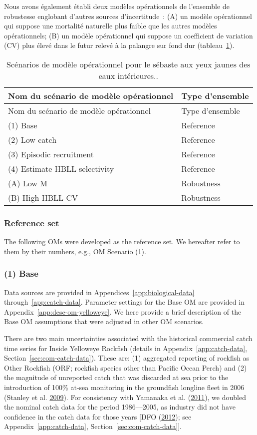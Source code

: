 \documentclass[11pt]{book}
\begin{document}
Nous avons également établi deux modèles opérationnels de l'ensemble de robustesse englobant d'autres sources d'incertitude~: (A) un modèle opérationnel qui suppose une mortalité naturelle plus faible que les autres modèles opérationnels; (B) un modèle opérationnel qui suppose un coefficient de variation (CV) plus élevé dans le futur relevé à la palangre sur fond dur (tableau~\ref{tab:ye-scen}).
\begin{longtable}[]{@{}ll@{}}
\caption{\label{tab:ye-scen}Scénarios de modèle opérationnel pour le sébaste aux yeux jaunes des eaux intérieures..}\tabularnewline
\toprule
Nom du scénario de modèle opérationnel & Type d'ensemble\tabularnewline
\midrule
\endfirsthead
\toprule
Nom du scénario de modèle opérationnel & Type d'ensemble\tabularnewline
\midrule
\endhead
(1) Base & Reference\tabularnewline
(2) Low catch & Reference\tabularnewline
(3) Episodic recruitment & Reference\tabularnewline
(4) Estimate HBLL selectivity & Reference\tabularnewline
(A) Low M & Robustness\tabularnewline
(B) High HBLL CV & Robustness\tabularnewline
\bottomrule
\end{longtable}
\hypertarget{sec:approach3-reference}{%
\subsubsection{Reference set}\label{sec:approach3-reference}}

The following OMs were developed as the reference set. We hereafter refer to them by their numbers, e.g., OM Scenario (1).

\hypertarget{sec:approach3-reference1}{%
\subsubsection{(1) Base}\label{sec:approach3-reference1}}

Data sources are provided in Appendices~\ref{app:biological-data} through~\ref{app:catch-data}. Parameter settings for the Base OM are provided in Appendix~\ref{app:desc-om-yelloweye}. We here provide a brief description of the Base OM assumptions that were adjusted in other OM scenarios.

There are two main uncertainties associated with the historical commercial catch time series for Inside Yelloweye Rockfish (details in Appendix~\ref{app:catch-data}, Section~\ref{sec:com-catch-data}). These are: (1) aggregated reporting of rockfish as Other Rockfish (ORF; rockfish species other than Pacific Ocean Perch) and (2) the magnitude of unreported catch that was discarded at sea prior to the introduction of 100\% at-sea monitoring in the groundfish longline fleet in 2006 (Stanley et al. \protect\hyperlink{ref-stanley2009}{2009}). For consistency with Yamanaka et al. (\protect\hyperlink{ref-yamanaka2011}{2011}), we doubled the nominal catch data for the period 1986---2005, as industry did not have confidence in the catch data for those years {[}DFO (\protect\hyperlink{ref-dfo2012}{2012}); see Appendix~\ref{app:catch-data}, Section~\ref{sec:com-catch-data}{]}.
\end{document}
